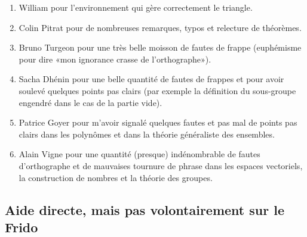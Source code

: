 \begin{enumerate}
    \item 
        William pour l'environnement  qui gère correctement le triangle.
    \item
        Colin Pitrat pour de nombreuses remarques, typos et relecture de théorèmes.
    \item
        Bruno Turgeon pour une très belle moisson de fautes de frappe (euphémisme pour dire «mon ignorance crasse de l'orthographe»).
    \item
        Sacha Dhénin pour une belle quantité de fautes de frappes et pour avoir soulevé quelques points pas clairs (par exemple la définition du sous-groupe engendré dans le cas de la partie vide).
    \item
        Patrice Goyer pour m'avoir signalé quelques fautes et pas mal de points pas clairs dans les polynômes et dans la théorie généraliste des ensembles.
    \item
        Alain Vigne pour une quantité (presque) indénombrable de fautes d'orthographe et de mauvaises tournure de phrase dans les espaces vectoriels, la construction de nombres et la théorie des groupes.
\end{enumerate}

\subsection{Aide directe, mais pas volontairement sur le Frido}

